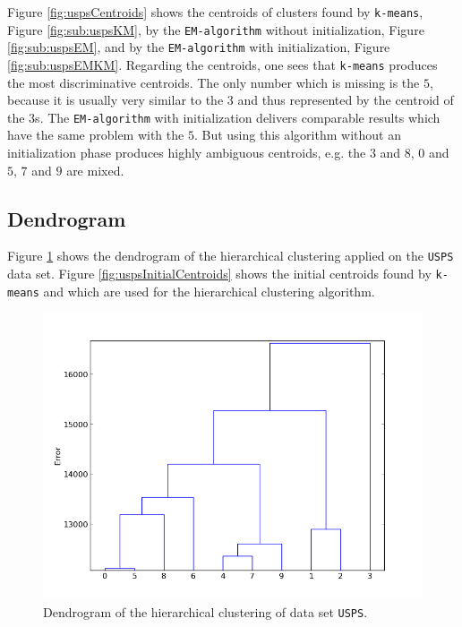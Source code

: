 \documentclass[a4paper, 12pt, titlepage]{article}
\begin{document}
Figure \ref{fig:uspsCentroids} shows the centroids of clusters found by \texttt{k-means}, Figure \ref{fig:sub:uspsKM}, by the \texttt{EM-algorithm} without initialization, Figure \ref{fig:sub:uspsEM}, and by the \texttt{EM-algorithm} with initialization, Figure \ref{fig:sub:uspsEMKM}.
Regarding the centroids, one sees that \texttt{k-means} produces the most discriminative centroids.
The only number which is missing is the $5$, because it is usually very similar to the $3$ and thus represented by the centroid of the $3$s.
The \texttt{EM-algorithm} with initialization delivers comparable results which have the same problem with the $5$.
But using this algorithm without an initialization phase produces highly ambiguous centroids, e.g. the $3$ and $8$, $0$ and $5$, $7$ and $9$ are mixed.

\subsection{Dendrogram}

Figure \ref{fig:uspsDendrogram} shows the dendrogram of the hierarchical clustering applied on the \texttt{USPS} data set.
Figure \ref{fig:uspsInitialCentroids} shows the initial centroids found by \texttt{k-means} and which are used for the hierarchical clustering algorithm.

\begin{figure}
	\centering
	\includegraphics[width=12cm]{images/uspsdendrogram.png}
	\caption{Dendrogram of the hierarchical clustering of data set \texttt{USPS}.}
	\label{fig:uspsDendrogram}
\end{figure}
\end{document}
